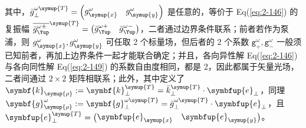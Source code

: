 其中，$\bar{g}^{\omega\symup{T}}_{\perp} = \begin{pmatrix} g^{\omega}_{\symup{x}} & g^{\omega}_{\symup{y}} \end{pmatrix}$ 是任意的，等价于 Eq(\ref{eq:2-146}) 的复振幅 $\overline{\bar{g}^{\omega\pm}_{\Yup}}^{\symup{T}} = \begin{pmatrix} \bar{g}^{\omega+}_{\Yup} & \bar{g}^{\omega-}_{\Yup} \end{pmatrix}$，二者通过边界条件联系；前者若作为泵浦，则 $g^{\omega}_{\symup{x}}, g^{\omega}_{\symup{y}}$ 可任取 2 个标量场，但后者的 2 个系数 ${\mathtt{g}}^{\omega}_{+}, {\mathtt{g}}^{\omega}_{-}$ 一般须已知前者，再加上边界条件一起才能联合确定；并且，各向异性解 Eq(\ref{eq:2-146}) 与各向同性解 Eq(\ref{eq:2-149}) 的系数自由度相同，都是 2，因此都属于矢量光场，二者间通过 $2 \times 2$ 矩阵相联系；此外，其中定义了 $\symbf{k}_{\symup{\rho}} := \symbf{k}^{\symup{T}}_{\perp} = \bar{k}^{\symup{T}}_{\perp} \cdot {\symbfup{e}}_{\perp}$，同理 $\symbf{g}^{\omega}_{\symup{\rho}} := \symbf{g}^{\omega\symup{T}}_{\perp} = \bar{g}^{\omega\symup{T}}_{\perp} \cdot {\symbfup{e}}_{\perp}$，且 ${\symbfup{e}}^{\symup{T}}_{\perp} = \begin{pmatrix} {\symbfup{e}}_{\symup{x}} & {\symbfup{e}}_{\symup{y}} \end{pmatrix}$。

